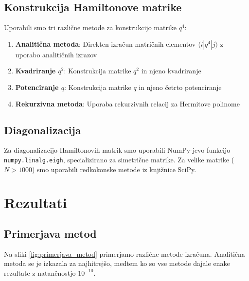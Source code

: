 \documentclass[12pt,a4paper]{article}
\begin{document}
\subsection{Konstrukcija Hamiltonove matrike}

Uporabili smo tri različne metode za konstrukcijo matrike $q^4$:

\begin{enumerate}
    \item \textbf{Analitična metoda}: Direkten izračun matričnih elementov $\langle i|q^4|j\rangle$ z uporabo analitičnih izrazov
    \item \textbf{Kvadriranje $q^2$}: Konstrukcija matrike $q^2$ in njeno kvadriranje
    \item \textbf{Potenciranje $q$}: Konstrukcija matrike $q$ in njeno četrto potenciranje
    \item \textbf{Rekurzivna metoda}: Uporaba rekurzivnih relacij za Hermitove polinome
\end{enumerate}

\subsection{Diagonalizacija}

Za diagonalizacijo Hamiltonovih matrik smo uporabili NumPy-jevo funkcijo \texttt{numpy.linalg.eigh}, 
specializirano za simetrične matrike. Za velike matrike ($N > 1000$) smo uporabili redkokonske metode iz knjižnice SciPy.

\newpage
\section{Rezultati}

\subsection{Primerjava metod}

Na sliki \ref{fig:primerjava_metod} primerjamo različne metode izračuna. 
Analitična metoda se je izkazala za najhitrejšo, 
medtem ko so vse metode dajale enake rezultate z natančnostjo $10^{-10}$.
\end{document}
